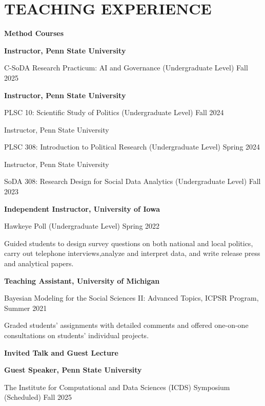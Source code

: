 \documentclass[10.5pt,]{article}
\providecommand{\tightlist}{%
	\setlength{\itemsep}{0pt}\setlength{\parskip}{0pt}}
\renewenvironment{itemize}{
	\begin{list}{}{
			\setlength{\leftmargin}{1.5em}
		}
	}{
	\end{list}
}
\begin{document}
\section{TEACHING EXPERIENCE}\label{teaching-experience}

\begin{itemize}
\tightlist
\item
  \textbf{Method Courses}

  \begin{itemize}
  \tightlist
  \item
    \textbf{Instructor, Penn State University}
  \item
    C-SoDA Research Practicum: AI and Governance (Undergraduate Level)
    \hfill Fall 2025
  \item
    \textbf{Instructor, Penn State University}
  \item
    PLSC 10: Scientific Study of Politics (Undergraduate Level)
    \hfill Fall 2024
  \item
    Instructor, Penn State University
  \item
    PLSC 308: Introduction to Political Research (Undergraduate Level)
    \hfill Spring 2024
  \item
    Instructor, Penn State University
  \item
    SoDA 308: Research Design for Social Data Analytics (Undergraduate
    Level) \hfill Fall 2023
  \item
    \textbf{Independent Instructor, University of Iowa}
  \item
    Hawkeye Poll (Undergraduate Level) \hfill Spring 2022
  \item
    Guided students to design survey questions on both national and
    local politics, carry out telephone interviews,analyze and interpret
    data, and write release press and analytical papers.
  \item
    \textbf{Teaching Assistant, University of Michigan}
  \item
    Bayesian Modeling for the Social Sciences II: Advanced Topics, ICPSR
    Program, \hfill Summer 2021
  \item
    Graded students' assignments with detailed comments and offered
    one-on-one consultations on students' individual projects.
  \end{itemize}
\item
  \textbf{Invited Talk and Guest Lecture}

  \begin{itemize}
  \tightlist
  \item
    \textbf{Guest Speaker, Penn State University}
  \item
    The Institute for Computational and Data Sciences (ICDS) Symposium
    (Scheduled) \hfill Fall 2025


\end{itemize}
\end{itemize}
\end{document}
